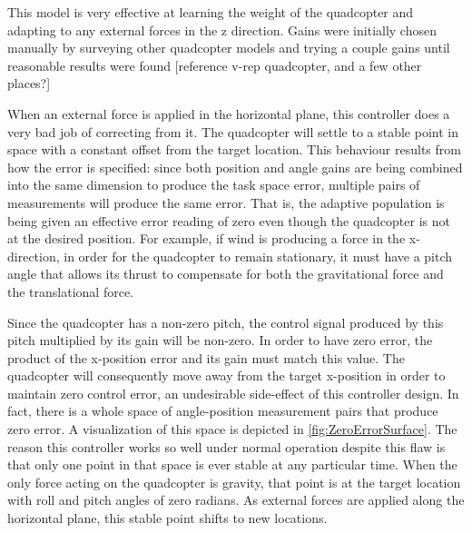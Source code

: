 \documentclass[letterpaper,12pt,titlepage,oneside,final]{book}
\begin{document}
This model is very effective at learning the weight of the quadcopter and adapting to any external forces in the z direction. 
Gains were initially chosen manually by surveying other quadcopter models and trying a couple gains until reasonable results were found [reference v-rep quadcopter, and a few other places?]

When an external force is applied in the horizontal plane, this controller does a very bad job of correcting from it. 
The quadcopter will settle to a stable point in space with a constant offset from the target location. 
This behaviour results from how the error is specified:
since both position and angle gains are being combined into the same dimension to produce the task space error, multiple pairs of measurements will produce the same error. 
That is, the adaptive population is being given an effective error reading of zero even though the quadcopter is not at the desired position. 
For example, if wind is producing a force in the x-direction, in order for the quadcopter to remain stationary, it must have a pitch angle that allows its thrust to compensate for both the gravitational force and the translational force.


Since the quadcopter has a non-zero pitch, the control signal produced by this pitch multiplied by its gain will be non-zero. 
In order to have zero error, the product of the x-position error and its gain must match this value. 
The quadcopter will consequently move away from the target x-position in order to maintain zero control error, an undesirable side-effect of this controller design. 
In fact, there is a whole space of angle-position measurement pairs that produce zero error.
A visualization of this space is depicted in \autoref{fig:ZeroErrorSurface}. 
The reason this controller works so well under normal operation despite this flaw is that only one point in that space is ever stable at any particular time. 
When the only force acting on the quadcopter is gravity, that point is at the target location with roll and pitch angles of zero radians. 
As external forces are applied along the horizontal plane, this stable point shifts to new locations.
\end{document}
